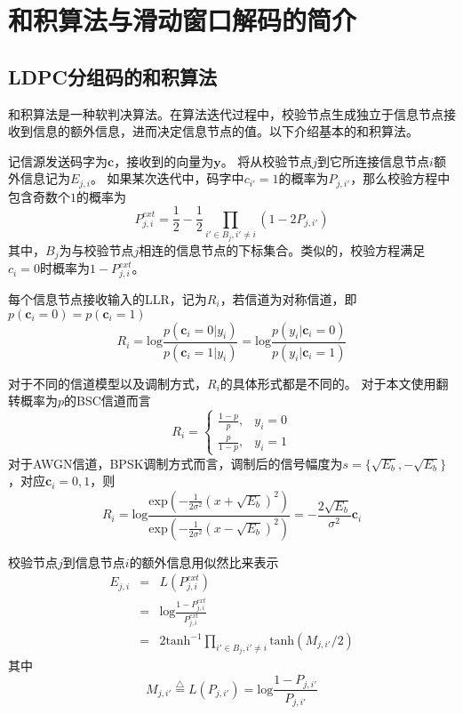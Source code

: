 \chapter{和积算法与滑动窗口解码的简介}
\section{LDPC分组码的和积算法}
和积算法是一种软判决算法。在算法迭代过程中，校验节点生成独立于信息节点接收到信息的额外信息，进而决定信息节点的值。以下介绍基本的和积算法。

记信源发送码字为$\mathbf{c}$，接收到的向量为$\mathbf{y}$。
将从校验节点$j$到它所连接信息节点$i$额外信息记为$E_{j,i}$。
如果某次迭代中，码字中$c_{i'}=1$的概率为$P_{j,i'}$，那么校验方程中包含奇数个$1$的概率为
\begin{equation}
P_{j,i}^{ext} = \frac{1}{2} - \frac{1}{2} \prod_{i' \in B_j, i' \neq i} (1-2P_{j,i'})
\end{equation}
其中，$B_j$为与校验节点$j$相连的信息节点的下标集合。类似的，校验方程满足$c_{i}=0$时概率为$1-P_{j,i}^{ext}$。

每个信息节点接收输入的LLR，记为$R_i$，若信道为对称信道，即$p(\mathbf{c}_i=0) = p(\mathbf{c}_i=1)$
\begin{equation}
R_i= \text{log} \frac{p(\mathbf{c}_i=0|y_i)}{p(\mathbf{c}_i=1|y_i)} = \text{log} \frac{p(y_i|\mathbf{c}_i=0)}{p(y_i|\mathbf{c}_i=1)}
\end{equation}

对于不同的信道模型以及调制方式，$R_i$的具体形式都是不同的。
对于本文使用翻转概率为$p$的BSC信道而言
\begin{equation}
  R_i = \left \{
    \begin{array}{rl}
      \frac{1-p}{p}, & y_i=0 \\
      \frac{p}{1-p}, & y_i=1 
    \end{array} \right.
\end{equation}
对于AWGN信道，BPSK调制方式而言，调制后的信号幅度为$s=\{\sqrt{E_b},-\sqrt{E_b}\}$，对应$\mathbf{c}_i={0,1}$，则
\begin{equation}
R_i= \text{log} \frac{ \text{exp}(-\frac{1}{2\sigma^2}(x+\sqrt{E_b})^2) }{\text{exp}(-\frac{1}{2\sigma^2}(x-\sqrt{E_b})^2)} = -\frac{2\sqrt{E_b}}{\sigma^2}\mathbf{c}_i
\end{equation}

校验节点$j$到信息节点$i$的额外信息用似然比来表示
\begin{eqnarray}
E_{j,i} & = & L(P_{j,i}^{ext})\\
& = & \text{log} \frac{1-P_{j,i}^{ext}}{P_{j,i}^{ext}}\\
& = & 2 \text{tanh}^{-1} \prod_{i' \in B_j, i' \neq i} \text{tanh} (M_{j,i'}/2)
\end{eqnarray}
其中
\begin{equation}
M_{j,i'} \stackrel{\triangle}{=} L(P_{j,i'}) = \text{log} \frac{1-P_{j,i'}}{P_{j,i'}}
\end{equation}

